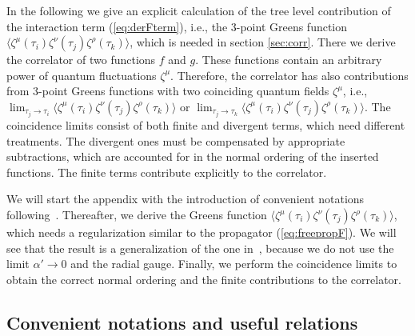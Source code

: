 \documentclass[a4paper,12pt]{article}
\let\bra=\langle        \let\ket=\rangle
\begin{document}
In the following we give an explicit calculation of the tree level 
contribution of the interaction term (\ref{eq:derFterm}), i.e., the
3-point Greens function 
$\bra\!\zeta^\mu(\tau_i) \zeta^\nu(\tau_j) \zeta^\rho(\tau_k)\!\ket$, 
which is needed in section \ref{sec:corr}. 
There we derive the correlator of two
functions $f$ and $g$. These functions contain an arbitrary power
of quantum fluctuations $\zeta^\mu$. Therefore, the correlator
has also contributions from 3-point Greens functions with two
coinciding quantum fields $\zeta^\mu$, i.e., 
$\lim_{\tau_j\rightarrow\tau_i}\bra\zeta^\mu(\tau_i)\zeta^\nu(\tau_j)\zeta^\rho(\tau_k)\ket$ or 
$\lim_{\tau_j \rightarrow \tau_k}\bra\zeta^\mu(\tau_i) \zeta^\nu(\tau_j) \zeta^\rho(\tau_k)\ket$.
The coincidence limits consist of both finite and divergent terms,
which need different treatments. The divergent ones must be
compensated by appropriate subtractions, which are accounted for in
the normal ordering of the inserted functions. The finite terms
contribute explicitly to the correlator.

We will start the appendix with the introduction of convenient
notations following~\cite{Cornalba:2001sm}. Thereafter, we derive the
Greens function
$\bra\zeta^\mu(\tau_i) \zeta^\nu(\tau_j) \zeta^\rho(\tau_k)\ket$, which
needs a regularization similar to the propagator
(\ref{eq:freepropF}). We will see that the result is a generalization
of the one in~\cite{Cornalba:2001sm}, because we do not use the
limit $\alpha'\!\rightarrow\!0$ and the radial gauge.
Finally, we perform the coincidence limits
to obtain the correct normal ordering and the finite contributions to
the correlator.


\subsection{Convenient notations and useful relations}
\end{document}
